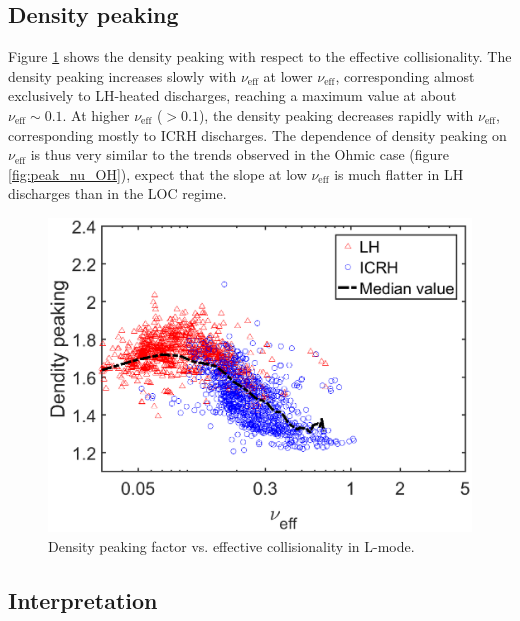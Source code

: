 \subsection{Density peaking}

Figure \ref{fig:peak_nu_Lmode} shows the density peaking with respect to the effective collisionality. The density peaking increases slowly with $\nu_\mathrm{eff}$ at lower $\nu_\mathrm{eff}$, corresponding almost exclusively to LH-heated discharges, reaching a maximum value at about $\nu_\mathrm{eff} \sim 0.1$. At higher $\nu_\mathrm{eff}$ ($> 0.1$), the density peaking decreases rapidly with $\nu_\mathrm{eff}$, corresponding mostly to ICRH discharges. The dependence of density peaking on $\nu_\mathrm{eff}$ is thus very similar to the trends observed in the Ohmic case (figure \ref{fig:peak_nu_OH}), expect that the slope at low $\nu_\mathrm{eff}$ is much flatter in LH discharges than in the LOC regime.


\begin{figure}[h]
\begin{centering}
\includegraphics[scale=0.6]{fig_peak_nu_Lmode_med.eps}
\par\end{centering}
\caption{Density peaking factor vs. effective collisionality in L-mode.}
\label{fig:peak_nu_Lmode}
\end{figure}


\subsection{Interpretation}


